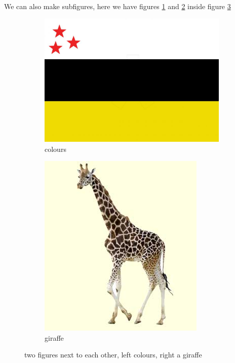 \documentclass[thesis]{subfiles}
\begin{document}
We can also make subfigures, here we have figures \ref{fig:coulors} and \ref{fig:littleanimal} inside figure \ref{fig:subfigures}
\begin{figure}
	\begin{subfigure}[b] 	%
		{0.45\textwidth}    %
		\centering
		\includegraphics[width=\linewidth]{ibavlag.jpg}
		\caption{colours}
		\label{fig:coulors}
	\end{subfigure}
	\begin{subfigure}[b]
		{0.45\textwidth}
		\centering
		\includegraphics[width=\linewidth]{Giraffe_klein.jpg}
		\caption{giraffe}
		\label{fig:littleanimal}
	\end{subfigure}	
	\caption{two figures next to each other, left colours, right a giraffe}
	\label{fig:subfigures}
\end{figure}
		
\end{document}
